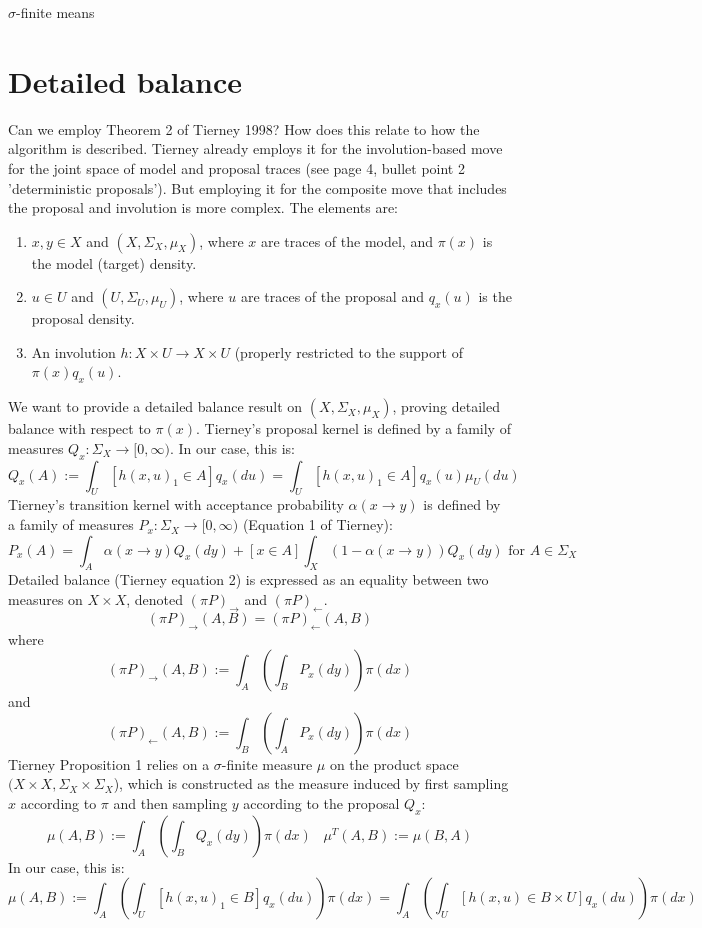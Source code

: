 \documentclass[twoside]{article}
\begin{document}
$\sigma$-finite means 

\section{Detailed balance}

Can we employ Theorem 2 of Tierney 1998? How does this relate to how the algorithm is described.
Tierney already employs it for the involution-based move for the joint space of model and proposal traces (see page 4, bullet point 2 'deterministic proposals').
But employing it for the composite move that includes the proposal and involution is more complex.
The elements are:
\begin{enumerate}
\item $x, y \in X$ and $(X, \Sigma_X, \mu_X)$, where $x$ are traces of the model, and $\pi(x)$ is the model (target) density.
\item $u \in U$ and $(U, \Sigma_U, \mu_U)$, where $u$ are traces of the proposal and $q_{x}(u)$ is the proposal density.
\item An involution $h : X \times U \to X \times U$ (properly restricted to the support of $\pi(x) q_{x}(u)$.
\end{enumerate}
We want to provide a detailed balance result on $(X, \Sigma_X, \mu_X)$, proving detailed balance with respect to $\pi(x)$.
Tierney's proposal kernel is defined by a family of measures $Q_{x} : \Sigma_X \to [0, \infty)$.
In our case, this is:
\[
Q_{x}(A) := \int_U [h(x, u)_1 \in A] q_{x}(du) = \int_U [h(x, u)_1 \in A] q_{x}(u) \mu_U(du)
\]
Tierney's transition kernel with acceptance probability $\alpha(x \to y)$ is defined by a family of measures $P_x : \Sigma_X \to [0, \infty)$ (Equation 1 of Tierney):
\[
P_x(A) = \int_A \alpha(x \to y) Q_x(dy) + [x \in A] \int_X (1 - \alpha(x \to y)) Q_x(dy) \mbox{ for } A \in \Sigma_X
\]
Detailed balance (Tierney equation 2) is expressed as an equality between two measures on $X \times X$, denoted $(\pi P)_{\to}$ and $(\pi P)_{\gets}$.
\[
(\pi P)_{\to}(A, B) = (\pi P)_{\gets}(A, B)
\]
where
\[
(\pi P)_{\to}(A, B) := \int_A \left( \int_B P_x(dy) \right) \pi(dx)
\]
and
\[
(\pi P)_{\gets}(A, B) := \int_B \left( \int_A P_x(dy) \right) \pi(dx)
\]
Tierney Proposition 1 relies on a $\sigma$-finite measure $\mu$ on the product space $(X \times X, \Sigma_X \times \Sigma_X$), which is constructed as
the measure induced by first sampling $x$ according to $\pi$ and then sampling $y$ according to the proposal $Q_x$:
\[
\mu(A, B) := \int_A \left( \int_B Q_x(dy) \right) \pi(dx) \;\;\; \mu^T(A, B) := \mu(B, A)
\]
In our case, this is:
\[
\mu(A, B) := \int_A \left( \int_U [h(x, u)_1 \in B] q_{x}(du) \right) \pi(dx) = \int_A \left( \int_U [h(x, u) \in B \times U] q_{x}(du) \right) \pi(dx)
\]
\end{document}
